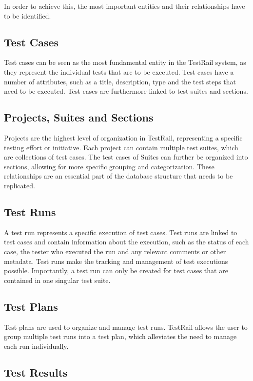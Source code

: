 In order to achieve this, the most important entities and their relationships have to be identified.

\subsection{Test Cases}

Test cases can be seen as the most fundamental entity in the TestRail system, as they represent the individual tests that are to be executed. Test cases have a number of attributes, such as a title, description, type and the test steps that need to be executed. Test cases are furthermore linked to test suites and sections. 

\subsection{Projects, Suites and Sections}

Projects are the highest level of organization in TestRail, representing a specific testing effort or initiative. Each project can contain multiple test suites, which are collections of test cases. The test cases of Suites can further be organized into sections, allowing for more specific grouping and categorization. These relationships are an essential part of the database structure that needs to be replicated.

\subsection{Test Runs}

A test run represents a specific execution of test cases. Test runs are linked to test cases and contain information about the execution, such as the status of each case, the tester who executed the run and any relevant comments or other metadata. Test runs make the tracking and management of test executions possible. Importantly, a test run can only be created for test cases that are contained in one singular test suite.

\subsection{Test Plans}

Test plans are used to organize and manage test runs. TestRail allows the user to group multiple test runs into a test plan, which alleviates the need to manage each run individually.

\subsection{Test Results}

